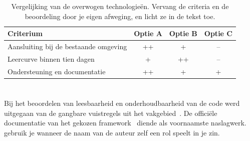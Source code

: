 \begin{table}[htbp]
  \centering
  \begin{tabular}{lccc}
    \toprule
    \textbf{Criterium} & \textbf{Optie A} & \textbf{Optie B} & \textbf{Optie C} \\
    \midrule
    Aansluiting bij de bestaande omgeving & ++ & +  & -- \\
    Leercurve binnen tien dagen           & +  & ++ & -- \\
    Ondersteuning en documentatie         & ++ & +  & +  \\
    \bottomrule
  \end{tabular}
  \caption[Vergelijking van de overwogen technologieën]{\label{tab:vergelijking}%
    Vergelijking van de overwogen technologieën. Vervang de criteria en de
    beoordeling door je eigen afweging, en licht ze in de tekst toe.}
\end{table}

\section{}%
\label{sec:vergelijking-opleiding}


\section{}%
\label{sec:keuze}


Bij het beoordelen van leesbaarheid en onderhoudbaarheid van de code werd
uitgegaan van de gangbare vuistregels uit het vakgebied~\autocite{Martin2008}.
De officiële documentatie van het gekozen framework~\autocite{DockerDocs2026}
diende als voornaamste naslagwerk. \textcite{Fowler2018} gebruik je wanneer de
naam van de auteur zelf een rol speelt in je zin.

